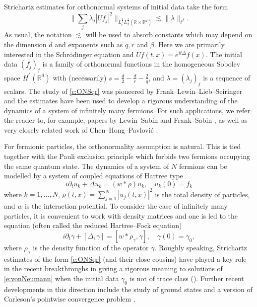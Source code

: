 \documentclass[a4paper]{amsart}
\numberwithin{equation}{section}%
\theoremstyle{plain}%
\theoremstyle{definition}
\theoremstyle{remark}%
\begin{document}
Strichartz estimates for orthonormal systems of initial data take the form
\begin{equation} \label{e:ONSqr}
\bigg\| \sum_j \lambda_j |Uf_j|^2 \bigg\|_{L^{\frac{q}{2}}_tL^\frac{r}{2}_x(\mathbb{R} \times \mathbb{R}^d)} \lesssim \| \lambda \|_{\ell^\beta}.
\end{equation}
As usual, the notation $\lesssim$ will be used to absorb constants which may depend on the dimension $d$ and exponents such as $q,r$ and $\beta$. Here we are primarily interested in the Schr\"odinger equation and $Uf(t,x) = e^{it\Delta}f(x)$. The initial data $(f_j)_j$ is a family of orthonormal functions in the homogeneous Sobolev space $\dot{H}^{s}(\mathbb{R}^d)$ with (necessarily) $s = \frac{d}{2} - \frac{d}{r} - \frac{2}{q}$, and $\lambda = (\lambda_j)_j$ is a sequence of scalars. The study of \eqref{e:ONSqr} was pioneered by Frank--Lewin--Lieb--Seiringer \cite{FLLS} and the estimates have been used to develop a rigorous understanding of the dynamics of a system of infinitely many fermions. For such applications, we refer the reader to, for example, papers by Lewin--Sabin \cite{LewinSabin1, LewinSabin2} and Frank--Sabin \cite{FS_AJM}, as well as very closely related work of Chen--Hong--Pavlovi\'c \cite{CHP1, CHP2}.

For fermionic particles, the orthonormality assumption is natural. This is tied together with the Pauli exclusion principle which forbids two fermions occupying the same quantum state. The dynamics of a system of $N$ fermions can be modelled by a system of coupled equations of Hartree type
\[
i\partial_t u_k + \Delta u_k = (w * \rho)u_k, \quad u_k(0) = f_k
\]
where $k = 1,\ldots,N$, $\rho(t,x) = \sum_{j=1}^N |u_j(t,x)|^2$ is the total density of particles, and $w$ is the interaction potential. To consider the case of infinitely many particles, it is convenient to work with density matrices and one is led to the equation (often called the reduced Hartree--Fock equation)
\begin{equation} \label{e:vonNeumann}
i\partial_t \gamma + [\Delta,\gamma] = [w * \rho_\gamma,\gamma], \quad \gamma(0) = \gamma_0,
\end{equation}
where $\rho_\gamma$ is the density function of the operator $\gamma$. Roughly speaking, Strichartz estimates of the form \eqref{e:ONSqr} (and their close cousins) have played a key role in the recent breakthroughs in giving a rigorous meaning to solutions of \eqref{e:vonNeumann} when the initial data $\gamma_0$ is not of trace class (\cite{CHP1, CHP2, FS_AJM, LewinSabin1, LewinSabin2}). Further recent developments in this direction include the study of ground states \cite{FGL, GLN} and a version of Carleson's pointwise convergence problem \cite{BLN_Selecta}. 
\end{document}

